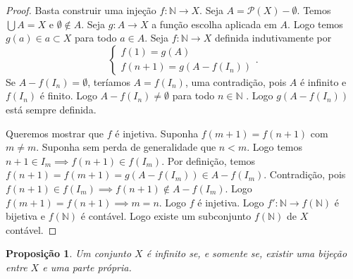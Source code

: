 \documentclass{article}
\theoremstyle{plain}
\newtheorem{prop}{Proposição}[section]
\theoremstyle{definition}
\theoremstyle{remark}
\begin{document}
\begin{proof}
	Basta construir uma injeção $f: \mathbb{N} \to X$. Seja $A = \mathcal{P}(X) - \emptyset$. Temos $\bigcup A = X$ e $\emptyset \not \in A$. Seja $g: A \to X$ a função escolha aplicada em $A$. Logo temos $g(a) \in a \subset X$ para todo $a\in A$. Seja $f: \mathbb{N} \to X$ definida indutivamente por $$ \begin{cases} f(1) = g(A) \\ f(n+1) = g(A -f(I_n) ) \end{cases} .$$  Se $A - f(I_n) = \emptyset$, teríamos $A = f(I_n)$, uma contradição, pois $A$ é infinito e $f(I_n)$ é finito. Logo $A - f(I_n) \neq \emptyset$ para todo $n \in \mathbb{N}$ .  Logo $g(A - f(I_n))$ está sempre definida.

		Queremos mostrar que $f$ é injetiva. Suponha $f(m+1) = f(n+1)$ com $m\neq m$. Suponha sem perda de generalidade que $n<m$. Logo temos $n+1\in I_m \implies f(n+1) \in f(I_m)$. Por definição, temos $ f(n+1) = f(m+1) =  g(A - f(I_m)) \in A - f(I_m)$. Contradição, pois $f(n+1) \in f(I_m) \implies f(n+1)\not \in A - f(I_m)$. Logo $f(m+1) = f(n+1) \implies m = n$. Logo $f$ é injetiva.
		Logo $f': \mathbb{N} \to f(\mathbb{N} )$ é bijetiva  e $f(\mathbb{N})$ é contável. Logo existe um subconjunto $f\left(\mathbb{N}\right)$ de $X$ contável.
\end{proof}
\begin{prop}
	Um conjunto $X$ é infinito se, e somente se, existir uma bijeção entre $X$ e uma parte própria.
\end{prop}
\end{document}
